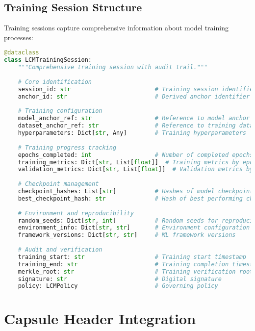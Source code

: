 \documentclass[12pt,a4paper]{article}
\begin{document}
\subsection{Training Session Structure}

Training sessions capture comprehensive information about model training processes:

\begin{lstlisting}[language=Python, caption=Training Session Structure]
@dataclass
class LCMTrainingSession:
    """Comprehensive training session with audit trail."""
    
    # Core identification
    session_id: str                        # Training session identifier
    anchor_id: str                         # Derived anchor identifier
    
    # Training configuration
    model_anchor_ref: str                  # Reference to model anchor
    dataset_anchor_ref: str                # Reference to training dataset
    hyperparameters: Dict[str, Any]        # Training hyperparameters
    
    # Training progress tracking
    epochs_completed: int                  # Number of completed epochs
    training_metrics: Dict[str, List[float]]  # Training metrics by epoch
    validation_metrics: Dict[str, List[float]]  # Validation metrics by epoch
    
    # Checkpoint management
    checkpoint_hashes: List[str]           # Hashes of model checkpoints
    best_checkpoint_hash: str              # Hash of best performing checkpoint
    
    # Environment and reproducibility
    random_seeds: Dict[str, int]           # Random seeds for reproducibility
    environment_info: Dict[str, str]       # Environment configuration
    framework_versions: Dict[str, str]     # ML framework versions
    
    # Audit and verification
    training_start: str                    # Training start timestamp
    training_end: str                      # Training completion timestamp
    merkle_root: str                       # Training verification root
    signature: str                         # Digital signature
    policy: LCMPolicy                      # Governing policy
\end{lstlisting}

\section{Capsule Header Integration}
\end{document}
